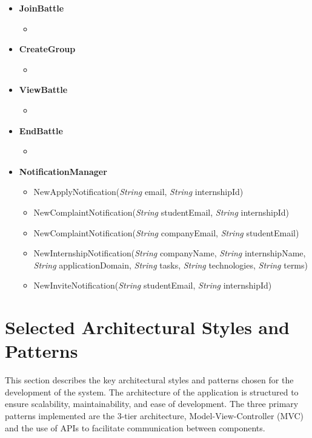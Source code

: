 \begin{itemize}
    \item \textbf{\textbf{JoinBattle}}
\begin{itemize}
    \item 
    \end{itemize}


    \item \textbf{\textbf{CreateGroup}}
\begin{itemize}
        \item 
\end{itemize}

    \item \textbf{\textbf{ViewBattle}}
    \begin{itemize}
        \item 
\end{itemize}

    \item \textbf{\textbf{EndBattle}}
\begin{itemize}
        \item 
\end{itemize}

    \item \textbf{\textbf{NotificationManager}}
\begin{itemize}
        \item NewApplyNotification(\textit{String} email, \textit{String} internshipId)
        \item NewComplaintNotification(\textit{String} studentEmail, \textit{String} internshipId)
        \item NewComplaintNotification(\textit{String} companyEmail, \textit{String} studentEmail)
        \item NewInternshipNotification(\textit{String}  companyName, \textit{String} internshipName, \textit{String} applicationDomain, \textit{String} tasks, \textit{String} technologies, \textit{String}  terms)
        \item NewInviteNotification(\textit{String} studentEmail, \textit{String} internshipId)
\end{itemize}

\end{itemize}


\section{Selected Architectural Styles and Patterns}
\label{sec:selected_Srchitectural_styles_patterns}%
This section describes the key architectural styles and patterns chosen for the development of the system. The architecture of the application is structured to ensure scalability, maintainability, and ease of development. The three primary patterns implemented are the 3-tier architecture, Model-View-Controller (MVC) and the use of APIs to facilitate communication between components.

